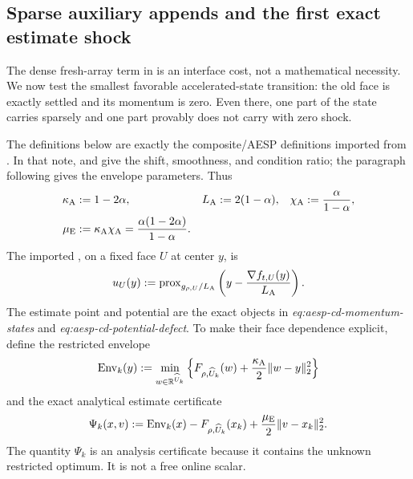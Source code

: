 \subsection{Sparse auxiliary appends and the first exact estimate shock}
\label{sec:branch-caterpillar-auxiliary-face-shock}

The dense fresh-array term in
 is an interface cost,
not a mathematical necessity.  We now test the smallest favorable
accelerated-state transition: the old face is exactly settled and its
momentum is zero.  Even there, one part of the state carries sparsely and one
part provably does not carry with zero shock.

The definitions below are exactly the composite/AESP definitions imported
from .  In that note,
 and
 give the shift, smoothness, and
condition ratio; the paragraph following
 gives the envelope parameters.  Thus
\begin{equation}
 \begin{aligned}
 \kappa_{\rm A}&:=1-2\alpha,
 &L_{\rm A}&:=2(1-\alpha),
 &\chi_{\rm A}&:=\frac{\alpha}{1-\alpha},\\
 \mu_{\rm E}&:=\kappa_{\rm A}\chi_{\rm A}
 =\frac{\alpha(1-2\alpha)}{1-\alpha}.
 \end{aligned}
 \label{eq:branch-caterpillar-auxiliary-parameters}
\end{equation}
The imported , on a fixed face $U$ at
center $y$, is
\begin{equation}
 u_U(y):=\operatorname{prox}_{g_{\rho,U}/L_{\rm A}}
 \left(y-\frac{\nabla f_{t,U}(y)}{L_{\rm A}}\right).
 \label{eq:branch-caterpillar-auxiliary-proximal-start}
\end{equation}
The estimate point and potential are the exact objects in
\emph{eq:aesp-cd-momentum-states} and
\emph{eq:aesp-cd-potential-defect}.  To make their face dependence
explicit, define the restricted envelope
\begin{equation}
 \operatorname{Env}_k(y):=
 \min_{w\in\mathbb R^{\widehat U_k}}
 \left\{F_{\rho,\widehat U_k}(w)
       +\frac{\kappa_{\rm A}}2\lVert w-y\rVert_2^2\right\}
 \label{eq:branch-caterpillar-restricted-envelope}
\end{equation}
and the exact analytical estimate certificate
\begin{equation}
 \Psi_k(x,v):=
 \operatorname{Env}_k(x)-F_{\rho,\widehat U_k}(x_k)
 +\frac{\mu_{\rm E}}2\lVert v-x_k\rVert_2^2.
 \label{eq:branch-caterpillar-restricted-estimate-certificate}
\end{equation}
The quantity $\Psi_k$ is an analysis certificate because it contains the
unknown restricted optimum.  It is not a free online scalar.

